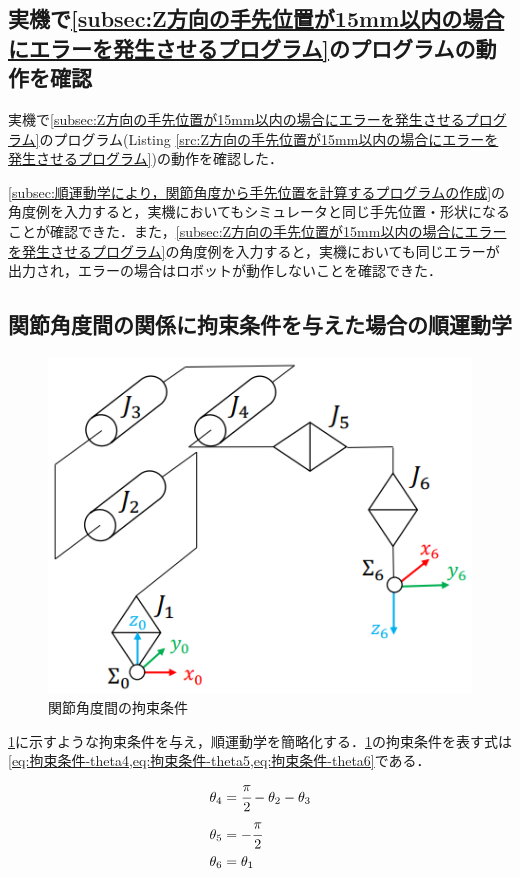 \documentclass{ltjsarticle}
\begin{document}
\subsection{実機で\cref{subsec:Z方向の手先位置が15mm以内の場合にエラーを発生させるプログラム}のプログラムの動作を確認}
実機で\cref{subsec:Z方向の手先位置が15mm以内の場合にエラーを発生させるプログラム}のプログラム(Listing \ref{src:Z方向の手先位置が15mm以内の場合にエラーを発生させるプログラム})の動作を確認した．

\cref{subsec:順運動学により，関節角度から手先位置を計算するプログラムの作成}の角度例を入力すると，実機においてもシミュレータと同じ手先位置・形状になることが確認できた．また，\cref{subsec:Z方向の手先位置が15mm以内の場合にエラーを発生させるプログラム}の角度例を入力すると，実機においても同じエラーが出力され，エラーの場合はロボットが動作しないことを確認できた．

\subsection{関節角度間の関係に拘束条件を与えた場合の順運動学}\label{subsec:関節角度間の関係に拘束条件を与えた場合の順運動学}
\begin{figure}[H]
	\centering
	\includegraphics[width = 0.75\linewidth]{../figures/robot_arm_constraints.png}
	\caption{関節角度間の拘束条件}
	\label{fig:関節角度間の拘束条件}
\end{figure}

\cref{fig:関節角度間の拘束条件}に示すような拘束条件を与え，順運動学を簡略化する．\cref{fig:関節角度間の拘束条件}の拘束条件を表す式は\cref{eq:拘束条件-theta4,eq:拘束条件-theta5,eq:拘束条件-theta6}である．
\begin{align}
	\label{eq:拘束条件-theta4}
	\theta_4 &= \cfrac{\pi}{2} - \theta_2 - \theta_3 \\
	\label{eq:拘束条件-theta5}
	\theta_5 &= -\cfrac{\pi}{2} \\
	\label{eq:拘束条件-theta6}
	\theta_6 &= \theta_1
\end{align}
\end{document}
